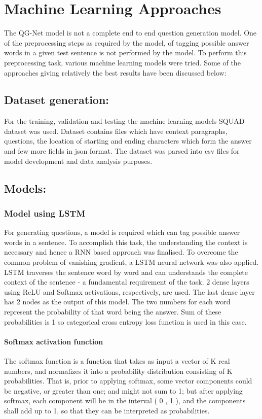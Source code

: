 \chapter{Machine Learning Approaches}

The QG-Net model is not a complete end to end question generation model. One of
the preprocessing steps as required by the model, of tagging possible answer
words in a given test sentence is not performed by the model. To perform this
preprocessing task, various machine learning models were tried. Some of the
approaches giving relatively the best results have been discussed below:

\section{Dataset generation:}

For the training, validation and testing the machine learning models SQUAD
dataset was used. Dataset contains files which have context paragraphs,
questions, the location of starting and ending characters which form the answer
and few more fields in json format. The dataset was parsed into csv files for
model development and data analysis purposes. 

\section{Models:}

\subsection{Model using LSTM}
For generating questions, a model is required which can tag possible answer
words in a sentence. To accomplish this task, the understanding the context is
necessary and hence a RNN based approach was finalised. To overcome the common
problem of vanishing gradient, a LSTM neural network was also applied. LSTM
traverses the sentence word by word and can understands the complete context of
the sentence - a fundamental requirement of the task. 2 dense layers using ReLU
and Softmax activations, respectively, are used.
The last dense layer has 2 nodes as the output of this model. The two numbers
for each word represent the probability of that word being the answer. Sum of
these probabilities is 1 so categorical cross entropy loss function is used in
this case.

\subsubsection{Softmax activation function}
The softmax function is a function that takes as input a vector of K real
numbers, and normalizes it into a probability distribution consisting of K
probabilities. That is, prior to applying softmax, some vector components could
be negative, or greater than one; and might not sum to 1; but after applying
softmax, each component will be in the interval ( 0 , 1 ), and the components
shall add up to 1, so that they can be interpreted as probabilities.


